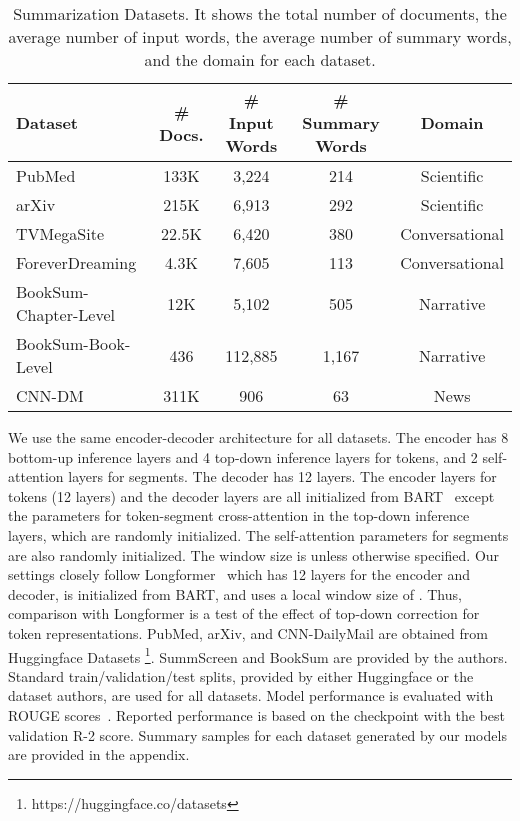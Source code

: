 \documentclass{article} \usepackage{iclr2022_conference,times}
\begin{document}
\begin{table*}[h!]
\small
\centering
\begin{tabular}{l c c c c} 
\toprule
Dataset & \# Docs. & \# Input Words & \# Summary Words & Domain\\
\hline
PubMed &133K & 3,224 & 214 & Scientific \\ 
arXiv &215K & 6,913 & 292 & Scientific \\ 
TVMegaSite & 22.5K & 6,420 & 380 & Conversational \\
ForeverDreaming & 4.3K & 7,605 & 113  & Conversational \\
BookSum-Chapter-Level & 12K & 5,102 & 505 & Narrative \\
BookSum-Book-Level & 436 & 112,885 & 1,167 & Narrative \\
CNN-DM & 311K & 906 & 63 & News \\ 
\hline
\end{tabular}
\caption{\scriptsize Summarization Datasets. It shows the total number of documents, the average number of input words, the average number of summary words, and the domain for each dataset.}
\label{table:datasets}
\end{table*}


We use the same encoder-decoder architecture for all datasets. The encoder has 8 bottom-up inference layers and 4 top-down inference layers for tokens, and 2 self-attention layers for segments. The decoder has 12 layers. The encoder layers for tokens (12 layers) and the decoder layers are all initialized from BART~\citep{lewis-etal-2020-bart} except the parameters for token-segment cross-attention in the top-down inference layers, which are randomly initialized. The self-attention parameters for segments are also randomly initialized. The window size is  unless otherwise specified. Our settings closely follow Longformer~\citep{beltagy2020longformer} which has 12 layers for the encoder and decoder, is initialized from BART, and uses a local window size of . Thus, comparison with Longformer is a test of the effect of top-down correction for token representations. PubMed, arXiv, and CNN-DailyMail are obtained from Huggingface Datasets \footnote{https://huggingface.co/datasets}. SummScreen and BookSum are provided by the authors. Standard train/validation/test splits, provided by either Huggingface or the dataset authors, are used for all datasets. Model performance is evaluated with ROUGE scores~\citep{lin-2004-rouge}. Reported performance is based on the checkpoint with the best validation R-2 score. Summary samples for each dataset generated by our models are provided in the appendix. 
\end{document}
